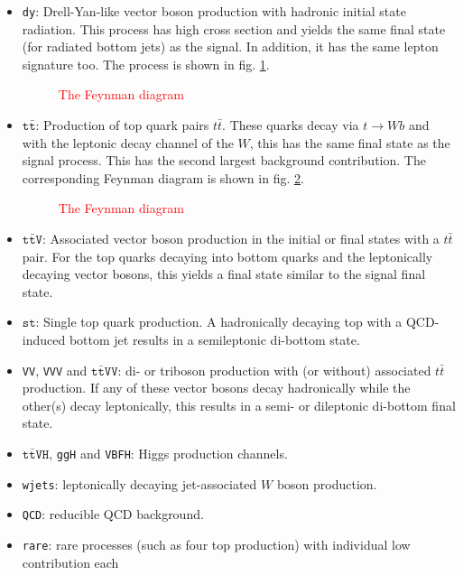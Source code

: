 \begin{itemize}
	\item[] \texttt{dy}: Drell-Yan-like vector boson production with hadronic initial state radiation. This process has high cross section and yields the same final state (for radiated bottom jets) as the signal. In addition, it has the same lepton signature too. The process is shown in fig. \ref{fig:dy_background}.
	\begin{figure}[h!]
		\centering
		\caption{\textcolor{red}{The Feynman diagram}}
		\label{fig:dy_background}
	\end{figure}
	\item[] $\texttt{t}\bar{\texttt{t}}$: Production of top quark pairs $t\bar{t}$. These quarks decay via $t\rightarrow Wb$ and with the leptonic decay channel of the $W$, this has the same final state as the signal process. This has the second largest background contribution. The corresponding Feynman diagram is shown in fig. \ref{fig:tt_background}.
	\begin{figure}[h!]
		\centering
		\caption{\textcolor{red}{The Feynman diagram}}
		\label{fig:tt_background}
	\end{figure}
	\item[] $\texttt{t}\bar{\texttt{t}}\texttt{V}$: Associated vector boson production in the initial or final states with a $t\bar{t}$ pair. For the top quarks decaying into bottom quarks and the leptonically decaying vector bosons, this yields a final state similar to the signal final state.
	\item[] $\texttt{st}$: Single top quark production. A hadronically decaying top with a QCD-induced bottom jet results in a semileptonic di-bottom state.
	\item[] \texttt{VV}, \texttt{VVV} and $\texttt{t}{\bar{\texttt{t}}}\texttt{VV}$: di- or triboson production with (or without) associated $t\bar{t}$ production. If any of these vector bosons decay hadronically while the other(s) decay leptonically, this results in a semi- or dileptonic di-bottom final state.
	\item[] $\texttt{t}\bar{\texttt{t}}\texttt{VH}$, \texttt{ggH} and \texttt{VBFH}: Higgs production channels.
	\item[] \texttt{wjets}: leptonically decaying jet-associated $W$ boson production.
	\item[] \texttt{QCD}: reducible QCD background.
	\item[] \texttt{rare}: rare processes (such as four top production) with individual low contribution each
\end{itemize}

